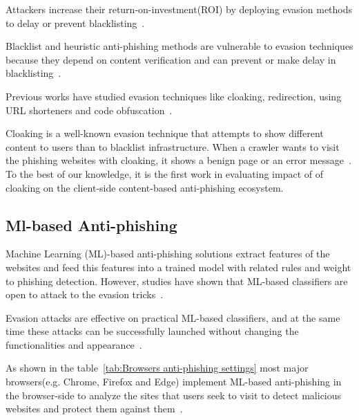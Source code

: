 \documentclass[letterpaper,twocolumn,10pt]{article}
\begin{document}
Attackers increase their return-on-investment(ROI) by deploying evasion methods to delay or prevent blacklisting~\cite{han2016phisheye,nero2011phishing,oest2019phishfarm}. 

Blacklist and heuristic anti-phishing methods are vulnerable to evasion techniques because they depend on content verification and can prevent or make delay in blacklisting~\cite{oest2019phishfarm}.

Previous works have studied evasion techniques like cloaking, redirection, using URL shorteners and code obfuscation~\cite{fette2007learning,cova2008there,chhabra2011phi}.

Cloaking is a well-known evasion technique that attempts to show different content to users than to blacklist infrastructure. When a crawler wants to visit the phishing websites with cloaking, it shows a benign page or an error message~\cite{invernizzi2016cloak}.
To the best of our knowledge, it is the first work in evaluating impact of of cloaking on the client-side content-based anti-phishing ecosystem.

\subsection{Ml-based Anti-phishing}

Machine Learning (ML)-based anti-phishing solutions extract features of the websites and feed this features into a trained model with related rules and weight to phishing detection. However, studies have shown that ML-based classifiers are open to attack to the evasion tricks~\cite{lei2020advanced,laskov2014practical,chen2018automated,xuposter,hu2017black,anderson2019adversarial,aleroud2020bypassing,sabir2020evasion}. 

Evasion attacks are effective on practical ML-based classifiers, and at the same time these attacks can be successfully launched without changing the functionalities and appearance~\cite{lei2020advanced}.

As shown in the table~\ref{tab:Browsers anti-phishing settings} most major browsers(e.g. Chrome, Firefox and Edge) implement ML-based anti-phishing in the browser-side to analyze the sites that users seek to visit to detect malicious websites and protect them against them~\cite{mjcaparas,whittaker2010large}.
\end{document}
